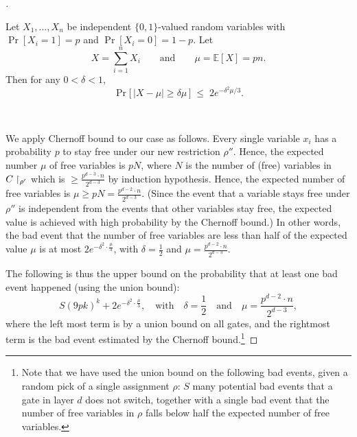 \begin{proof}[]
\begin{tcolorbox}[colframe=white, colback=gray!11, boxrule=0mm, sharp corners]
\begin{theorem}
Let $X_1,\dots,X_n$ be independent $\{0,1\}$-valued random variables with $\Pr[X_i=1]=p$ and $\Pr[X_i=0]=1-p$. Let
\[
X=\sum_{i=1}^n X_i
\qquad\text{and}\qquad
\mu=\mathbb{E}[X]=pn.
\]
Then for any $0<\delta<1$,
\[
\Pr\big[\,|X-\mu| \ge \delta\mu\,\big]
\;\le\;
2e^{-\delta^2\mu/3}.
\]
\end{theorem}
\end{tcolorbox}



\
\

We apply Chernoff bound to our case as follows.
Every single variable \( x_i \) has a probability \( p \) to stay free under our new restriction  \( \rho'' \).
Hence, the expected number $\mu$ of free variables is \( pN \), where $N$ is the number of (free) variables in $C\upharpoonright_{\rho'}$ which is $\ge \frac{p^{d-3} \cdot n}{2^{d-3}}$ by induction hypothesis. Hence, the expected number of free variables is $\mu\ge pN= \frac{p^{d-2} \cdot n}{2^{d-3}}$. 
(Since the event that a variable stays free under \( \rho'' \) is independent from the events that other variables stay free, the expected value is achieved with high probability by the Chernoff bound.)
 In other words, the bad event that the number of free variables are less than half of the expected value $\mu$ is at most $
2e^{-\delta^2 \cdot \frac{\mu}{3}}$, with $\delta = \frac{1}{2}$ and  $\mu = \frac{p^{d-2} \cdot n}{2^{d-3}}.$

The following is thus the upper bound on the probability that at least one bad event happened (using the union bound): 
\begin{equation}\label{eq:487:28}
 S(9pk)^k + 2e^{-\delta^2 \cdot \frac{\mu}{3}}, \quad \text{with} \quad \delta = \frac{1}{2} \quad \text{and} \quad \mu = \frac{p^{d-2} \cdot n}{2^{d-3}},
\end{equation}
where the left most term is by a union bound on all gates, and the rightmost term is the bad event estimated by the  Chernoff bound.\footnote{Note that we have used the union bound on the following bad events, given a random pick of a single assignment $\rho$: $S$ many potential bad events that a gate in layer $d$ does not switch, together with a single bad event that the number of free variables in $\rho$ falls below half the expected number of free variables.
}




\end{proof}
